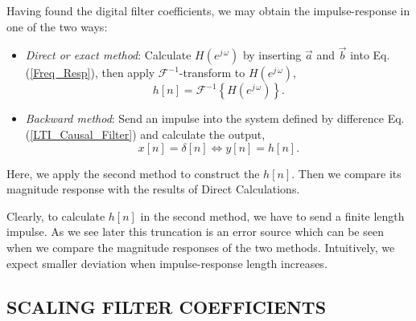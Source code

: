 \documentclass{sebase}
\begin{document}
Having found the digital filter coefficients, we may obtain the
impulse-response in one of the two ways:

\begin{itemize}
\item \textit{Direct or exact method}: Calculate $H\left( e^{j\,\omega
}\right) $ by inserting $\vec{a}$ and $\vec{b}$ into Eq. (\ref{Freq_Resp}),
then apply $\mathcal{F}^{-1}$-transform to $H\left( e^{j\,\omega }\right) $, 
\begin{equation}
h\left[ n\right] =\mathcal{F}^{-1}\left\{ H\left( e^{j\,\omega }\right)
\right\} .
\end{equation}

\item \textit{Backward method}: Send an impulse into the system defined by
difference Eq. (\ref{LTI_Causal_Filter}) and calculate the output, 
\begin{equation}
x\left[ n\right] =\delta \left[ n\right] \Leftrightarrow y\left[ n\right] =h%
\left[ n\right] .
\end{equation}
\end{itemize}

Here, we apply the second method to construct the $h\left[ n\right] $. Then
we compare its magnitude response with the results of Direct Calculations.

\begin{remark}
Clearly, to calculate $h\left[ n\right] $ in the second method, we have to
send a finite length impulse. As we see later this truncation is an error
source which can be seen when we compare the magnitude responses of the two
methods. Intuitively, we expect smaller deviation when impulse-response
length increases.
\end{remark}

\subsection{SCALING FILTER COEFFICIENTS}
\end{document}
